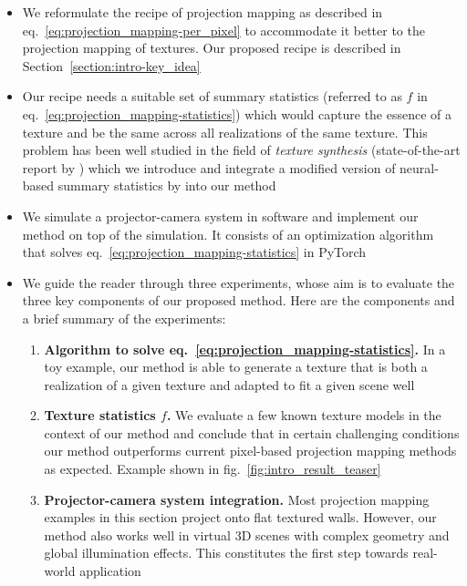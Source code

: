 \begin{itemize}
    \item We reformulate the recipe of projection mapping as described in eq.~\ref{eq:projection_mapping-per_pixel} to accommodate it better to the projection mapping of textures. Our proposed recipe is described in Section~\ref{section:intro-key_idea}
    \item Our recipe needs a suitable set of summary statistics (referred to as \(f\) in eq.~\ref{eq:projection_mapping-statistics}) which would capture the essence of a texture and be the same across all realizations of the same texture. This problem has been well studied in the field of \textit{texture synthesis} (state-of-the-art report by \citet{Raad2018}) which we introduce and integrate a modified version of neural-based summary statistics by \citet{Gatys2015} into our method
    \item We simulate a projector-camera system in software and implement our method on top of the simulation. It consists of an optimization algorithm that solves eq.~\ref{eq:projection_mapping-statistics} in PyTorch
    \item We guide the reader through three experiments, whose aim is to evaluate the three key components of our proposed method. Here are the components and a brief summary of the experiments:
    \begin{enumerate}
        \item \textbf{Algorithm to solve eq.~\ref{eq:projection_mapping-statistics}.} In a toy example, our method is able to generate a texture that is both a realization of a given texture and adapted to fit a given scene well
        \item \textbf{Texture statistics \(f\).} We evaluate a few known texture models in the context of our method and conclude that in certain challenging conditions our method outperforms current pixel-based projection mapping methods as expected. Example shown in fig.~\ref{fig:intro_result_teaser}
        \item \textbf{Projector-camera system integration.} Most projection mapping examples in this section project onto flat textured walls. However, our method also works well in virtual 3D scenes with complex geometry and global illumination effects. This constitutes the first step towards real-world application
    \end{enumerate}
\end{itemize}

